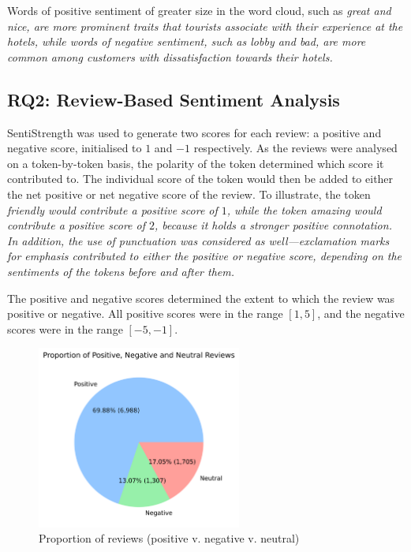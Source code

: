 \documentclass[12pt,bibliography=totocnumbered]{scrartcl}
\begin{document}
Words of positive sentiment of greater size in the word cloud,
such as \it{great} and \it{nice}, are more prominent traits that tourists associate
with their experience at the hotels, while words of negative sentiment, such as \it{lobby}
and \it{bad}, are more common among customers with dissatisfaction towards their hotels.

\subsection{RQ2: Review-Based Sentiment Analysis}
SentiStrength was used to generate two scores for each review: a positive and
negative score, initialised to $1$ and $-1$ respectively. As the reviews were analysed
on a token-by-token basis, the polarity of the token determined which score it contributed
to. The individual score of the token would then be added to either the net positive or
net negative score of the review. To illustrate, the token \it{friendly} would contribute
a positive score of $1$, while the token \it{amazing} would contribute a positive score of $2$,
because it holds a stronger positive connotation. In addition, the use of punctuation was
considered as well---exclamation marks for emphasis contributed to either the positive or
negative score, depending on the sentiments of the tokens before and after them.

The positive and negative scores determined the extent to which the review was positive
or negative. All positive scores were in the range $[1, 5]$, and the negative scores were
in the range $[-5, -1]$.

\begin{figure}[htpb]
	\begin{center}
		\includegraphics[width=0.6\textwidth]{../results/rq2/pie_chart_3part.png}
	\end{center}
	\caption{Proportion of reviews (positive v. negative v. neutral)}
	\label{fig:reviews-pie3}
\end{figure}
\end{document}
